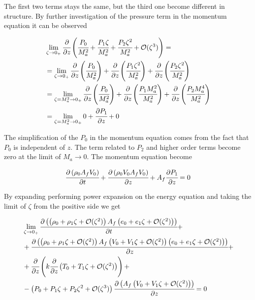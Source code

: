 \documentclass[../Article_Model_Parameters.tex]{subfiles}
\begin{document}
	The first two terms stays the same, but the third one become different in structure. By further investigation of the pressure term in the momentum equation it can be observed
	
	{\footnotesize
		\begin{align*}
			& \lim_{\zeta \rightarrow 0_+} \cfrac{\partial }{\partial z} \left(  \cfrac{P_0}{M_a^2}	+ \cfrac{P_1 \zeta}{M_a^2}	+ \cfrac{P_2 \zeta^2}{M_a^2} + \mathcal{O}(\zeta^3) \right) = \\
			& = \lim_{\zeta \rightarrow 0_+} \cfrac{\partial }{\partial z} \left(  \cfrac{P_0}{M_a^2} \right) + \cfrac{\partial }{\partial z} \left(  \cfrac{P_1 \zeta^2}{M_a^2} \right) + \cfrac{\partial }{\partial z} \left(  \cfrac{P_2 \zeta^2}{M_a^2} \right) \\
			& = \lim_{\zeta=M_a^2 \rightarrow 0_+} \cfrac{\partial }{\partial z} \left(  \cfrac{P_0}{M_a^2} \right) + \cfrac{\partial }{\partial z} \left(  \cfrac{P_1 M_a^2}{M_a^2} \right) + \cfrac{\partial }{\partial z} \left(  \cfrac{P_2 M_a^4}{M_a^2} \right) \\
			& = \lim_{\zeta=M_a^2 \rightarrow 0_+} 0 + \cfrac{\partial P_1}{\partial z}  + 0 \\
		\end{align*}
	}

	The simplification of the $P_0$ in the momentum equation comes from the fact that $P_0$ is independent of $z$. The term related to $P_2$ and higher order terms become zero at the limit of $M_a \rightarrow 0$. The momentum equation become
	
	{\footnotesize
		\begin{equation*}
			\cfrac{\partial \left( \rho_0 A_f V_0 \right) }{\partial t}	+ \cfrac{\partial \left( \rho_0 V_0 A_f V_0 \right)}{\partial z} + A_f \cfrac{\partial P_1}{\partial z} = 0
		\end{equation*}
	}

	By expanding performing power expansion on the energy equation and taking the limit of $\zeta$ from the positive side we get
	
	{\footnotesize
		\begin{align*}
			& \lim_{\zeta \rightarrow 0_+} \cfrac{\partial \left( \left( \rho_0	+ \rho_1 \zeta	+ \mathcal{O}(\zeta^2) \right) A_f \left( e_0	+ e_1 \zeta 	+ \mathcal{O}(\zeta^2) \right) \right)}{\partial t} + \\
			&+ \cfrac{\partial \left(  \left(  \rho_0	+ \rho_1 \zeta	+ \mathcal{O}(\zeta^2) \right) A_f \left( V_0	+ V_1 \zeta 	+ \mathcal{O}(\zeta^2) \right) \left( e_0	+ e_1 \zeta 	+ \mathcal{O}(\zeta^2) \right) \right) }{\partial z} + \\
			&+ \cfrac{\partial}{\partial z} \left( k \cfrac{\partial }{\partial z} \left( T_0 	+ T_1 \zeta 	+ \mathcal{O}(\zeta^2) \right) \right) + \\
			&- \left(  P_0 	+ P_1 \zeta		+ P_2 \zeta^2 		+ \mathcal{O}(\zeta^3)  \right) \cfrac{\partial \left( A_f \left( V_0 + V_1 \zeta + \mathcal{O}(\zeta^2) \right) \right) }{\partial z} = 0
		\end{align*}
	}
	
\end{document}
